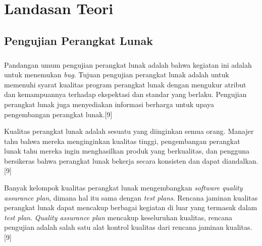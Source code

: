 \chapter{Landasan Teori}
\label{chap:teori}

\section{Pengujian Perangkat Lunak}
\label{softwaretesting}
\paragraph{}
Pandangan umum pengujian perangkat lunak adalah bahwa kegiatan ini adalah untuk menemukan \textit{bug}. Tujuan pengujian perangkat lunak adalah untuk memenuhi syarat kualitas program perangkat lunak dengan mengukur atribut dan kemampuannya terhadap ekspektasi dan standar yang berlaku. Pengujian perangkat lunak juga menyediakan informasi berharga untuk upaya pengembangan perangkat lunak.[9]

Kualitas perangkat lunak adalah sesuatu yang diinginkan semua orang. Manajer tahu bahwa mereka menginginkan kualitas tinggi, pengembangan perangkat lunak tahu mereka ingin menghasilkan produk yang berkualitas, dan pengguna bersikeras bahwa perangkat lunak bekerja secara konsisten dan dapat diandalkan.[9]

Banyak kelompok kualitas perangkat lunak mengembangkan \textit{software quality assurance plan}, dimana hal itu sama dengan \textit{test plans}. Rencana jaminan kualitas perangkat lunak dapat mencakup berbagai kegiatan di luar yang termasuk dalam \textit{test plan}. \textit{Quality assurance plan} mencakup keseluruhan kualitas, rencana pengujian adalah salah satu alat kontrol kualitas dari rencana jaminan kualitas.[9]

